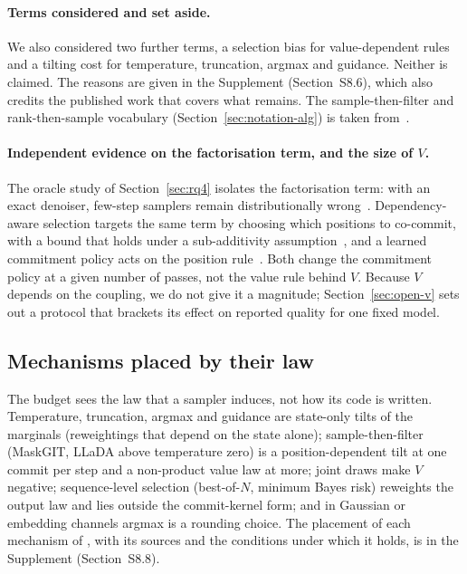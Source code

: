 \paragraph{Terms considered and set aside.} We also considered two further terms, a selection bias for value-dependent rules and a tilting cost for temperature, truncation, argmax and guidance. Neither is claimed. The reasons are given in the Supplement (Section~S8.6), which also credits the published work that covers what remains. The sample-then-filter and rank-then-sample vocabulary (Section~\ref{sec:notation-alg}) is taken from~\cite{arXiv:2604.00375}.

\paragraph{Independent evidence on the factorisation term, and the size of $V$.} The oracle study of Section~\ref{sec:rq4} isolates the factorisation term: with an exact denoiser, few-step samplers remain distributionally wrong~\cite{arXiv:2602.19619}. Dependency-aware selection targets the same term by choosing which positions to co-commit, with a bound that holds under a sub-additivity assumption~\cite{arXiv:2604.02560}, and a learned commitment policy acts on the position rule~\cite{arXiv:2605.24697}. Both change the commitment policy at a given number of passes, not the value rule behind $V$. Because $V$ depends on the coupling, we do not give it a magnitude; Section~\ref{sec:open-v} sets out a protocol that brackets its effect on reported quality for one fixed model.

\subsection{Mechanisms placed by their law}
\label{sec:budget-mechanisms}

The budget sees the law that a sampler induces, not how its code is written. Temperature, truncation, argmax and guidance are state-only tilts of the marginals (reweightings that depend on the state alone); sample-then-filter (MaskGIT, LLaDA above temperature zero) is a position-dependent tilt at one commit per step and a non-product value law at more; joint draws make $V$ negative; sequence-level selection (best-of-$N$, minimum Bayes risk) reweights the output law and lies outside the commit-kernel form; and in Gaussian or embedding channels argmax is a rounding choice. The placement of each mechanism of \suppTabDesign{}, with its sources and the conditions under which it holds, is in the Supplement (Section~S8.8). %

